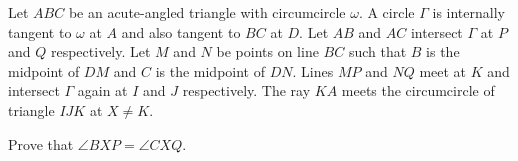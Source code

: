 Let $ABC$ be an acute-angled triangle with circumcircle $\omega$. A circle $\Gamma$ is internally tangent to $\omega$ at $A$ and also tangent to $BC$ at $D$. Let $AB$ and $AC$ intersect $\Gamma$ at $P$ and $Q$ respectively. Let $M$ and $N$ be points on line $BC$ such that $B$ is the midpoint of $DM$ and $C$ is the midpoint of $DN$. Lines $MP$ and $NQ$ meet at $K$ and intersect $\Gamma$ again at $I$ and $J$ respectively. The ray $KA$ meets the circumcircle of triangle $IJK$ at $X \neq K$.

Prove that $\angle BXP = \angle CXQ$.
